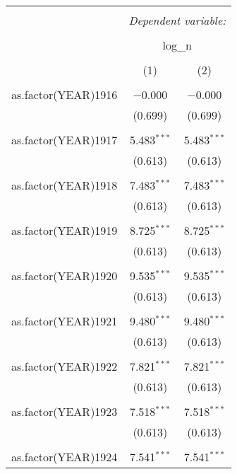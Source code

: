 \begin{table}[!htbp] \centering 
  \caption{} 
  \label{} 
\begin{tabular}{@{\extracolsep{5pt}}lcc} 
\\[-1.8ex]\hline 
\hline \\[-1.8ex] 
 & \multicolumn{2}{c}{\textit{Dependent variable:}} \\ 
\cline{2-3} 
\\[-1.8ex] & \multicolumn{2}{c}{log\_n} \\ 
\\[-1.8ex] & (1) & (2)\\ 
\hline \\[-1.8ex] 
 as.factor(YEAR)1916 & $-$0.000 & $-$0.000 \\ 
  & (0.699) & (0.699) \\ 
  & & \\ 
 as.factor(YEAR)1917 & 5.483$^{***}$ & 5.483$^{***}$ \\ 
  & (0.613) & (0.613) \\ 
  & & \\ 
 as.factor(YEAR)1918 & 7.483$^{***}$ & 7.483$^{***}$ \\ 
  & (0.613) & (0.613) \\ 
  & & \\ 
 as.factor(YEAR)1919 & 8.725$^{***}$ & 8.725$^{***}$ \\ 
  & (0.613) & (0.613) \\ 
  & & \\ 
 as.factor(YEAR)1920 & 9.535$^{***}$ & 9.535$^{***}$ \\ 
  & (0.613) & (0.613) \\ 
  & & \\ 
 as.factor(YEAR)1921 & 9.480$^{***}$ & 9.480$^{***}$ \\ 
  & (0.613) & (0.613) \\ 
  & & \\ 
 as.factor(YEAR)1922 & 7.821$^{***}$ & 7.821$^{***}$ \\ 
  & (0.613) & (0.613) \\ 
  & & \\ 
 as.factor(YEAR)1923 & 7.518$^{***}$ & 7.518$^{***}$ \\ 
  & (0.613) & (0.613) \\ 
  & & \\ 
 as.factor(YEAR)1924 & 7.541$^{***}$ & 7.541$^{***}$ \\ 

\end{tabular}
\end{table}
